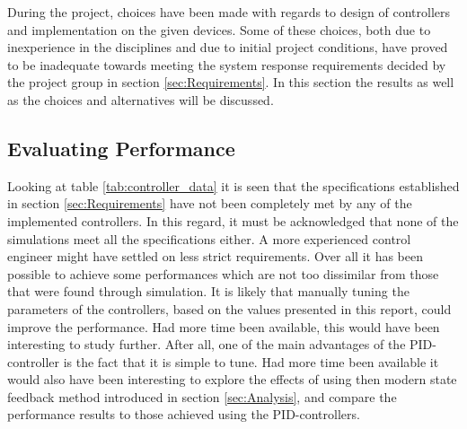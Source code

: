\documentclass[../../main.tex]{subfiles}
\begin{document}

During the project, choices have been made with regards to design of controllers and implementation on the given devices. Some of these choices, both due to inexperience in the disciplines and due to initial project conditions, have proved to be inadequate towards meeting the system response requirements decided by the project group in section \ref{sec:Requirements}. In this section the results as well as the choices and alternatives will be discussed.

\subsection{Evaluating Performance}

Looking at table \ref{tab:controller_data} it is seen that the specifications established in section \ref{sec:Requirements} have not been completely met by any of the implemented controllers. In this regard, it must be acknowledged that none of the simulations meet all the specifications either. A more experienced control engineer might have settled on less strict requirements.
Over all it has been possible to achieve some performances which are not too dissimilar from those that were found through simulation. It is likely that manually tuning the parameters of the controllers, based on the values presented in this report, could improve the performance. Had more time been available, this would have been interesting to study further. After all, one of the main advantages of the PID-controller is the fact that it is simple to tune. Had more time been available it would also have been interesting to explore the effects of using then modern state feedback method introduced in section \ref{sec:Analysis}, and compare the performance results to those achieved using the PID-controllers.
\end{document}

